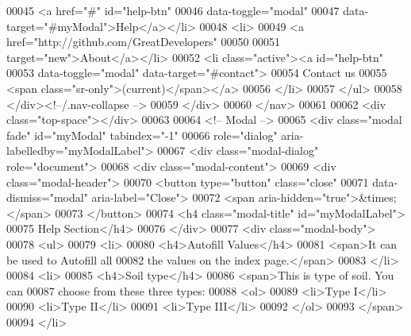 \begin{DoxyCode}
00045                             <a href="#" id="help-btn" 
00046                                 data-toggle="modal"
00047                                 data-target="#myModal">Help</a></li>
00048                         <li>
00049                             <a href="http://github.com/GreatDevelopers"
00050                                
00051 target="new">About</a></li>
00052                         <li class="active"><a id="help-btn" 
00053                             data-toggle="modal" data-target="#contact">
00054                             Contact us
00055                             <span class="sr-only">(current)</span></a>
00056                         </li>
00057                     </ul>
00058                 </div><!--/.nav-collapse -->
00059             </div>
00060          </nav>
00061          
00062         <div class="top-space"></div>
00063 
00064         <!-- Modal -->
00065         <div class="modal fade" id="myModal" tabindex="-1"
00066             role="dialog" aria-labelledby="myModalLabel">
00067             <div class="modal-dialog" role="document">
00068                 <div class="modal-content">
00069                     <div class="modal-header">
00070                         <button type="button" class="close"
00071                             data-dismiss="modal" aria-label="Close">
00072                             <span aria-hidden="true">&times;</span>
00073                         </button>
00074                         <h4 class="modal-title" id="myModalLabel">
00075                             Help Section</h4>
00076                     </div>
00077                     <div class="modal-body">
00078                         <ul>
00079                             <li>
00080                                 <h4>Autofill Values</h4>
00081                                 <span>It can be used to Autofill all 
00082                                 the values on the index page.</span>
00083                             </li>
00084                             <li>
00085                                 <h4>Soil type</h4>
00086                                 <span>This is type of soil. You can 
00087                                 choose from these three types:
00088                                     <ol>
00089                                         <li>Type I</li>
00090                                         <li>Type II</li>
00091                                             <li>Type III</li>
00092                                     </ol>
00093                                 </span>
00094                             </li>

\end{DoxyCode}
